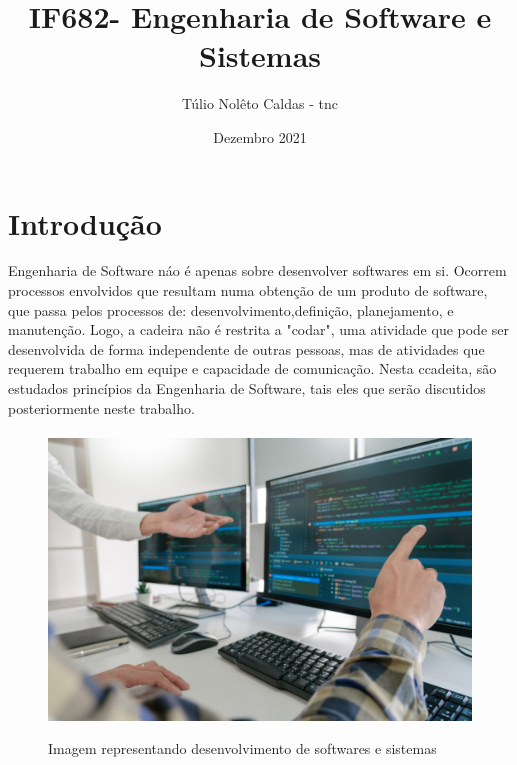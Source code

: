 \documentclass{article}
\title{IF682- Engenharia de Software e Sistemas}
\author{Túlio Nolêto Caldas - tnc}
\date {Dezembro 2021}
\begin{document}
\maketitle

\paragraph{}

\section{\textbf{Introdução}}

{ Engenharia de Software náo é apenas sobre desenvolver softwares em si. Ocorrem processos envolvidos que resultam numa obtenção de um produto de software, que passa pelos processos de: desenvolvimento,definição, planejamento, e manutenção.
Logo, a cadeira não é restrita a "codar", uma atividade que pode ser desenvolvida de forma independente de outras pessoas, mas de atividades que requerem trabalho em equipe e capacidade de comunicação. Nesta ccadeita, são estudados princípios da Engenharia de Software, tais eles que serão discutidos posteriormente neste trabalho.}\cite{Intro}

\paragraph{}


\begin{figure}[h!]
\centering
\includegraphics[scale=0.18]{imagens/Computador.jpeg} 
\caption{Imagem representando desenvolvimento de softwares e sistemas}\cite{computador1}
\label{fig:computador}
\end{figure}
\end{document}

